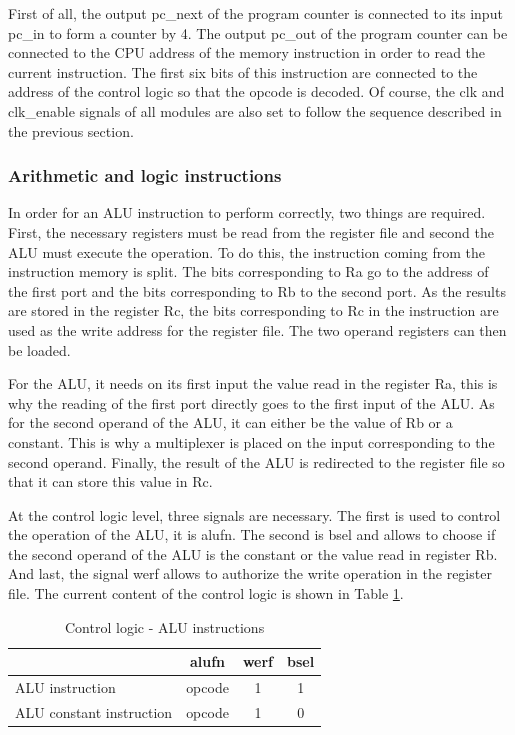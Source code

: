 First of all, the output pc\_next of the program counter is connected to its input pc\_in to form a 
counter by 4. The output pc\_out of the program counter can be connected to the CPU address of the 
memory instruction in order to read the current instruction. The first six bits of this instruction 
are connected to the address of the control logic so that the opcode is decoded. Of course, the clk 
and clk\_enable signals of all modules are also set to follow the sequence described in the previous 
section.

\subsubsection*{Arithmetic and logic instructions}

In order for an ALU instruction to perform correctly, two things are required. First, the 
necessary registers must be read from the register file and second the ALU must execute the operation. 
To do this, the instruction coming from the instruction memory is split. The bits corresponding to 
Ra go to the address of the first port and the bits corresponding to Rb to the second port. As the 
results are stored in the register Rc, the bits corresponding to Rc in the instruction are 
used as the write address for the register file. The two operand registers can then be loaded. 

For the ALU, it needs on its first input the value read in the register Ra, this is why the reading 
of the first port directly goes to the first input of the ALU. As for the second operand of the ALU, 
it can either be the value of Rb or a constant. This is why a multiplexer is placed on the input 
corresponding to the second operand. Finally, the result of the ALU is redirected to the register 
file so that it can store this value in Rc.

At the control logic level, three signals are necessary. The first is used to control the operation 
of the ALU, it is alufn. The second is bsel and allows to choose if the second operand of the ALU 
is the constant or the value read in register Rb. And last, the signal werf allows to 
authorize the write operation in the register file. The current content of the control logic is 
shown in Table \ref{tab:cl/alu}.

\begin{table}[H]
    \centering
    \begin{tabular}{|l|c|c|c|}
    \hline
    \rowcolor[HTML]{DAE8FC} 
    \multicolumn{1}{|c|}{\cellcolor[HTML]{DAE8FC}\textbf{Instruction}} & \textbf{alufn} & \textbf{werf} & \textbf{bsel} \\ \hline
    ALU instruction                                                    & opcode         & 1             & 1             \\ \hline
    ALU constant instruction                                           & opcode         & 1             & 0             \\ \hline
    \end{tabular}
    \caption{Control logic - ALU instructions}
    \label{tab:cl/alu}
\end{table}

